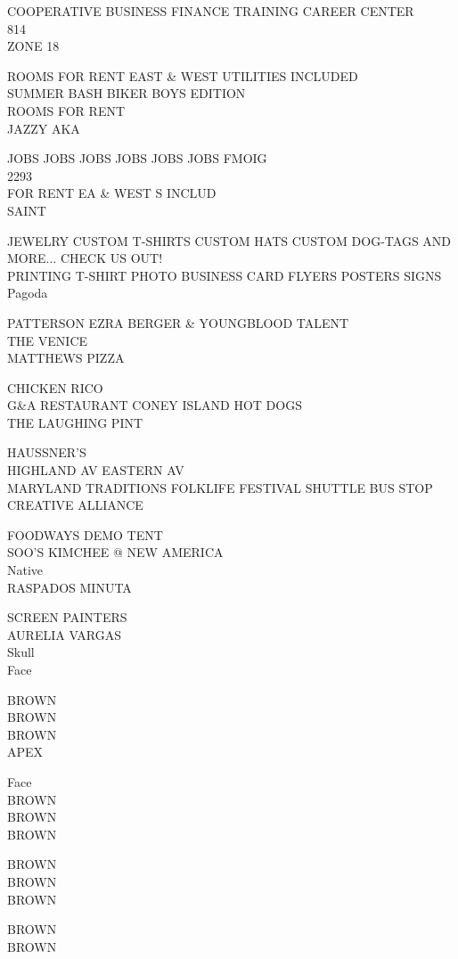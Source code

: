 \documentclass[10pt,letterpaper]{article}
\begin{document}
COOPERATIVE BUSINESS FINANCE TRAINING CAREER CENTER\\
814\\
ZONE 18

ROOMS FOR RENT EAST \& WEST UTILITIES INCLUDED\\
SUMMER BASH BIKER BOYS EDITION\\
ROOMS FOR RENT\\
JAZZY AKA

JOBS JOBS JOBS JOBS JOBS JOBS FMOIG\\
2293\\
FOR RENT EA \& WEST S INCLUD\\
SAINT

JEWELRY CUSTOM T{-}SHIRTS CUSTOM HATS CUSTOM DOG{-}TAGS AND MORE... CHECK US OUT!\\
PRINTING T{-}SHIRT PHOTO BUSINESS CARD FLYERS POSTERS SIGNS\\
Pagoda

PATTERSON EZRA BERGER \& YOUNGBLOOD TALENT\\
THE VENICE\\
MATTHEWS PIZZA

CHICKEN RICO\\
G\&A RESTAURANT CONEY ISLAND HOT DOGS\\
THE LAUGHING PINT

HAUSSNER'S\\
HIGHLAND AV EASTERN AV\\
MARYLAND TRADITIONS FOLKLIFE FESTIVAL SHUTTLE BUS STOP CREATIVE ALLIANCE

FOODWAYS DEMO TENT\\
SOO'S KIMCHEE @ NEW AMERICA\\
Native\\
RASPADOS MINUTA

SCREEN PAINTERS\\
AURELIA VARGAS\\
Skull\\
Face

BROWN\\
BROWN\\
BROWN\\
APEX

Face\\
BROWN\\
BROWN\\
BROWN

BROWN\\
BROWN\\
BROWN

BROWN\\
BROWN
\end{document}
